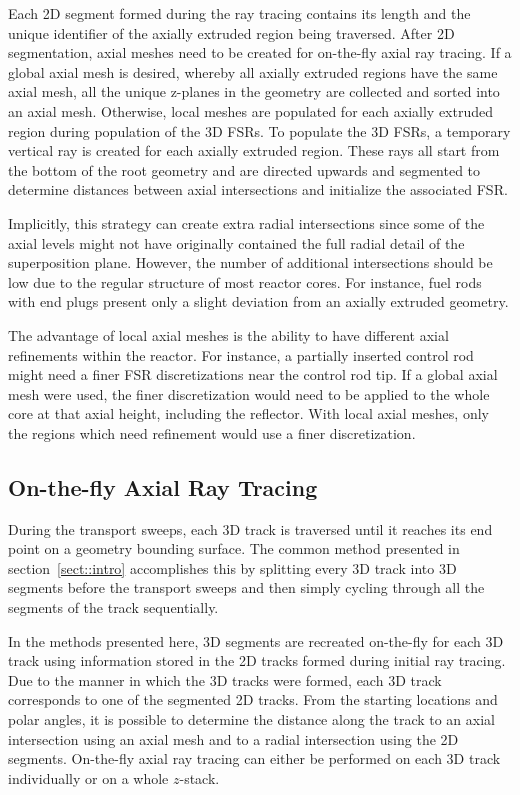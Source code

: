 Each 2D segment formed during the ray tracing contains its length and the unique identifier of the axially extruded region being traversed. After 2D segmentation, axial meshes need to be created for on-the-fly axial ray tracing. If a global axial mesh is desired, whereby all axially extruded regions have the same axial mesh, all the unique z-planes in the geometry are collected and sorted into an axial mesh. Otherwise, local meshes are populated for each axially extruded region during population of the 3D FSRs. To populate the 3D FSRs, a temporary vertical ray is created for each axially extruded region. These rays all start from the bottom of the root geometry and are directed upwards and segmented to determine distances between axial intersections and initialize the associated FSR.

Implicitly, this strategy can create extra radial intersections since some of the axial levels might not have originally contained the full radial detail of the superposition plane. However, the number of additional intersections should be low due to the regular structure of most reactor cores. For instance, fuel rods with end plugs present only a slight deviation from an axially extruded geometry.

The advantage of local axial meshes is the ability to have different axial refinements within the reactor. For instance, a partially inserted control rod might need a finer FSR discretizations near the control rod tip. If a global axial mesh were used, the finer discretization would need to be applied to the whole core at that axial height, including the reflector. With local axial meshes, only the regions which need refinement would use a finer discretization.

\subsection{On-the-fly Axial Ray Tracing}

During the transport sweeps, each 3D track is traversed until it reaches its end point on a geometry bounding surface. The common method presented in section~\ref{sect::intro} accomplishes this by splitting every 3D track into 3D segments before the transport sweeps and then simply cycling through all the segments of the track sequentially.

In the methods presented here, 3D segments are recreated on-the-fly for each 3D track using information stored in the 2D tracks formed during initial ray tracing. Due to the manner in which the 3D tracks were formed, each 3D track corresponds to one of the segmented 2D tracks. From the starting locations and polar angles, it is possible to determine the distance along the track to an axial intersection using an axial mesh and to a radial intersection using the 2D segments. On-the-fly axial ray tracing can either be performed on each 3D track individually or on a whole $z$-stack.

